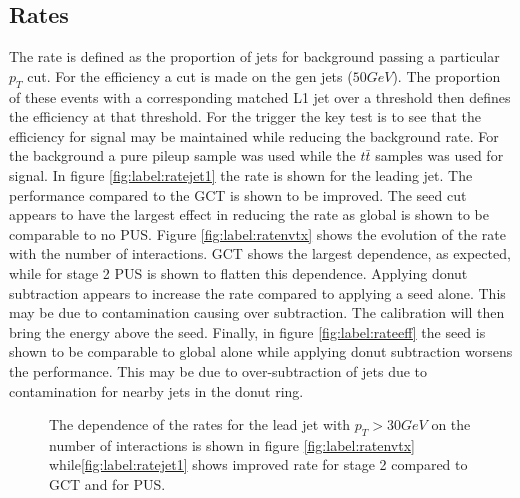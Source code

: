 \subsection{Rates}
The rate is defined as the proportion of jets for background passing a particular $p_{T}$ cut. For the efficiency a cut is made on the gen jets ($50GeV$). The proportion of these events with a corresponding matched L1 jet over a threshold then defines the efficiency at that threshold.  For the trigger the key test is to see that the efficiency for signal may be maintained while reducing the background rate. For the background a pure pileup sample was used while the $t\bar{t}$ samples was used for signal. In figure \ref{fig:label:ratejet1} the rate is shown for the leading jet. The performance compared to the GCT is shown to be improved. The seed cut appears to have the largest effect in reducing the rate as global is shown to be comparable to no PUS. Figure \ref{fig:label:ratenvtx} shows the evolution of the rate with the number of interactions. GCT shows the largest dependence, as expected, while for stage 2 PUS is shown to flatten this dependence. Applying donut subtraction appears to increase the rate compared to applying a seed alone. This may be due to contamination causing over subtraction. The calibration will then bring the energy above the seed. Finally, in figure \ref{fig:label:rateeff} the seed is shown to be comparable to global alone while applying donut subtraction worsens the performance. This may be due to over-subtraction of jets due to contamination for nearby jets in the donut ring.
\begin{figure}
\hfill
{}
\hfill
{}
\caption{The dependence of the rates for the lead jet with $p_T > 30 GeV$ on the number of interactions is shown in figure \ref{fig:label:ratenvtx} while\ref{fig:label:ratejet1} shows improved rate for stage 2 compared to GCT and for PUS.}
\label{fig:label:rates}
\end{figure}
